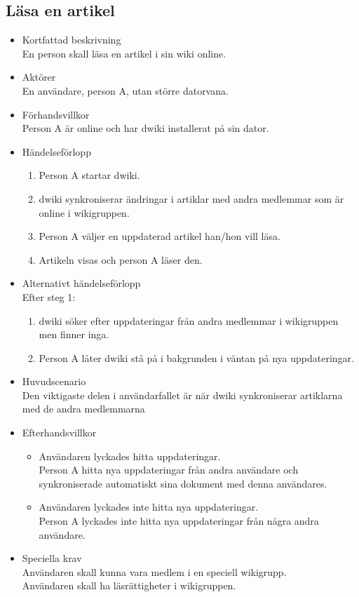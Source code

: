 \subsection{Läsa en artikel}
\begin{itemize}
	\item Kortfattad beskrivning
	\\En person skall läsa en artikel i sin wiki online.
	\item Aktörer
	\\En användare, person A, utan större datorvana.
	\item Förhandsvillkor
	\\Person A är online och har dwiki installerat på sin dator.
	\item Händelseförlopp
	\begin{enumerate}
		\item Person A startar dwiki.
		\item dwiki synkroniserar ändringar i artiklar med andra medlemmar som är online i wikigruppen.
		\item Person A väljer en uppdaterad artikel han/hon vill läsa.
		\item Artikeln visas och person A läser den.
	\end{enumerate}
	\item Alternativt händelseförlopp
	\\Efter steg 1:
	\begin{enumerate}	
		\item dwiki söker efter uppdateringar från andra medlemmar i wikigruppen men finner inga.
		\item Person A låter dwiki stå på i bakgrunden i väntan på nya uppdateringar.	
	\end{enumerate}	
	\item Huvudscenario
	\\Den viktigaste delen i användarfallet är när dwiki synkroniserar artiklarna med de andra medlemmarna
	\item Efterhandsvillkor
	\begin{itemize}
		\item Användaren lyckades hitta uppdateringar.
		\\Person A hitta nya uppdateringar från andra användare och synkroniserade automatiskt sina dokument med denna användares.
		\item Användaren lyckades inte hitta nya uppdateringar.
		\\Person A lyckades inte hitta nya uppdateringar från några andra användare.
	\end{itemize}	
	\item Speciella krav
	\\Användaren skall kunna vara medlem i en speciell wikigrupp.
	\\Användaren skall ha läsrättigheter i wikigruppen.
\end{itemize}

